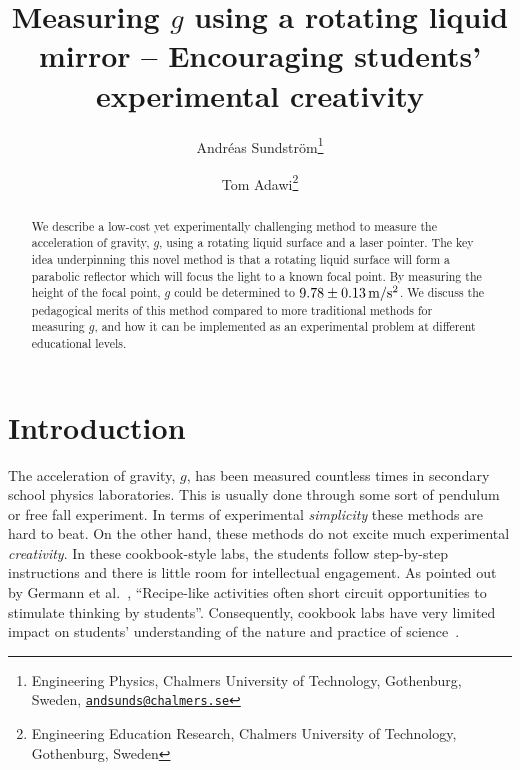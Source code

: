 \documentclass[11pt, a4paper, twocolumn, swedish, english]{article}
\begin{document}
\title{Measuring $g$ using a rotating liquid mirror --
  Encouraging students' experimental creativity} 

\newcommand{\andsunds}{andsunds@chalmers.se}
\author{Andréas Sundström\footnote{Engineering Physics, Chalmers
    University of Technology, Gothenburg, Sweden,
    \textcolor{blue}{\href{mailto:\andsunds}{\nolinkurl{\andsunds}}} }
\and Tom Adawi\footnote{Engineering Education Research, Chalmers
  University of Technology, Gothenburg, Sweden} 
}
\maketitle

\begin{abstract}
    We describe a low-cost yet experimentally
    challenging method to measure the acceleration of gravity, $g$,
    using a rotating liquid surface and a laser pointer. The key idea
    underpinning this novel method is that a rotating liquid surface
    will form a parabolic reflector which will focus the light to a
    known focal point. By measuring the height of the focal point, $g$
    could be determined to $\unit[9.78 \pm 0.13]{m/s^2}$. We discuss the
    pedagogical merits of this method compared to more traditional
    methods for measuring $g$, and how it can be implemented as an
    experimental problem at different educational levels. 
\end{abstract}


\section{Introduction}

The acceleration of gravity, $g$, has been measured countless times in
secondary school physics laboratories. This is usually done through
some sort of pendulum or free fall experiment. In terms of
experimental \emph{simplicity} these methods are hard to beat. On the other hand, these methods do not excite much experimental \emph{creativity}. In these cookbook-style labs, the students follow step-by-step
instructions and there is little room for intellectual engagement. As
pointed out by Germann et al.~\cite{Germann1996}, ``Recipe-like activities often short
circuit opportunities to stimulate thinking by
students''. Consequently, cookbook labs have very limited impact on
students' understanding of the nature and practice of
science~\cite{Domin1999}. 
\end{document}
